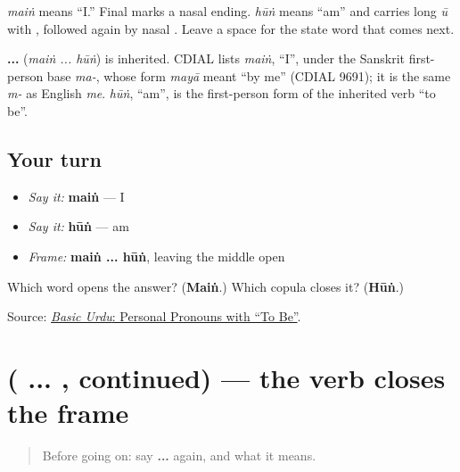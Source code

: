 \textbf{} \emph{maiṅ} means “I.” Final \textbf{} marks a nasal ending. \textbf{} \emph{hūṅ} means “am” and carries long \emph{ū} with \textbf{}, followed again by nasal \textbf{}. Leave a space for the state word that comes next.

\begin{cousinweb}
\textbf{ ... } (\emph{maiṅ ... hūṅ}) is inherited. CDIAL lists \emph{maiṅ}, \textquotedblleft{}I\textquotedblright{}, under the Sanskrit first-person base \emph{ma-}, whose form \emph{mayā} meant \textquotedblleft{}by me\textquotedblright{} (CDIAL 9691); it is the same \emph{m-} as English \emph{me}. \emph{hūṅ}, \textquotedblleft{}am\textquotedblright{}, is the first-person form of the inherited verb \textquotedblleft{}to be\textquotedblright{}.
\end{cousinweb}

\subsection*{Your turn}
\begin{itemize}
\raggedright
  \item \emph{Say it:} \textbf{maiṅ} — I
  \item \emph{Say it:} \textbf{hūṅ} — am
  \item \emph{Frame:} \textbf{maiṅ ... hūṅ}, leaving the middle open
\end{itemize}

\begin{tcolorbox}[breakable,colback=teal!4,colframe=teal!35!black,title={Before you move on}]
Which word opens the answer? (\textbf{Maiṅ}.) Which copula closes it? (\textbf{Hūṅ}.)

Source: \href{https://openbooks.lib.msu.edu/urdu/chapter/2-7/}{\emph{Basic Urdu}: Personal Pronouns with “To Be”}.
\end{tcolorbox}
\section[\texorpdfstring{(\ur{میں} ... \ur{ہوں}, continued)}{(میں ... ہوں, continued)}]{( ... , continued) — the verb closes the frame}

\label{lesson:UR-C04-main-hun-more}



\begin{quote}
Before going on: say \textbf{ ... } again, and what it means.
\end{quote}

